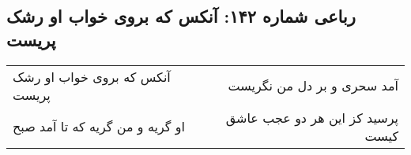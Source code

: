 \begin{center}
\section*{رباعی شماره ۱۴۲: آنکس که بروی خواب او رشک پریست}
\label{sec:0142}
\begin{longtable}{l p{0.5cm} r}
آنکس که بروی خواب او رشک پریست
&&
آمد سحری و بر دل من نگریست
\\
او گریه و من گریه که تا آمد صبح
&&
پرسید کز این هر دو عجب عاشق کیست
\\
\end{longtable}
\end{center}
